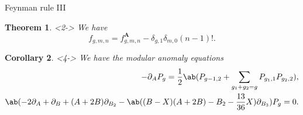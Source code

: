 \documentclass[10pt]{beamer}
\newcommand{\bA}{\mathbf{A}}
\newcommand{\1}{\mathbf{1}}
\newcommand{\2}{\mathbf{2}}
\newcommand{\3}{\mathbf{3}}
\newtheorem{thm}{Theorem}[section]
\newtheorem{cor}[thm]{Corollary}
\theoremstyle{definition}
\theoremstyle{remark}
\theoremstyle{plain}
\theoremstyle{definition}
\theoremstyle{remark}
\begin{document}
\begin{frame}{Feynman rule III}
  \begin{thm}<2->
    We have
    \[ f_{g,m,n} = f_{g,m,n}^{\bA} - \delta_{g,1} \delta_{m,0} (n-1)!. \]
  \end{thm}
  \begin{cor}<4->
    We have the \textit{modular anomaly equations}
    \footnotesize
    \begin{align*}
      - \partial_{A} P_g = \frac{1}{2} \ab(P_{g-1,2} + \sum_{g_1+g_2 = g} P_{g_1, 1} P_{g_2, 2}),  \\
      \ab(-2 \partial_{A} + \partial_{B} + (A+2B) \partial_{B_2} - \ab((B-X)(A+2B)-B_2-\frac{13}{36} X)\partial_{B_3})P_g = 0.
    \end{align*}
  \end{cor}
\end{frame}
\end{document}
